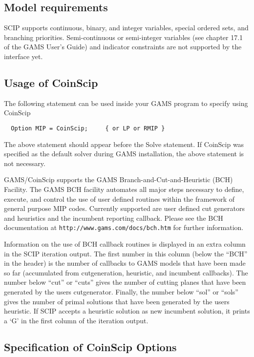\subsection{Model requirements}

SCIP supports continuous, binary, and integer variables, special ordered sets, and branching priorities.
Semi-continuous or semi-integer variables (see chapter 17.1 of the GAMS User's Guide) and indicator constraints are not supported by the interface yet.

\subsection{Usage of CoinScip}

The following statement can be used inside your GAMS program to specify using CoinScip
\begin{verbatim}
  Option MIP = CoinScip;     { or LP or RMIP }
\end{verbatim}

The above statement should appear before the Solve statement.
If CoinScip was specified as the default solver during GAMS installation, the above statement is not necessary.

GAMS/CoinScip supports the GAMS Branch-and-Cut-and-Heuristic (BCH) Facility.
The GAMS BCH facility automates all major steps necessary to define, execute, and control the use of user defined routines within the framework of general purpose MIP codes.
Currently supported are user defined cut generators and heuristics and the incumbent reporting callback.
Please see the BCH documentation at \texttt{http://www.gams.com/docs/bch.htm} for further information.

Information on the use of BCH callback routines is displayed in an extra column in the SCIP iteration output.
The first number in this column (below the ``BCH'' in the header) is the number of callbacks to GAMS models that have been made so far (accumulated from cutgeneration, heuristic, and incumbent callbacks).
The number below ``cut'' or ``cuts'' gives the number of cutting planes that have been generated by the users cutgenerator.
Finally, the number below ``sol'' or ``sols'' gives the number of primal solutions that have been generated by the users heuristic.
If SCIP accepts a heuristic solution as new incumbent solution, it prints a `G' in the first column of the iteration output.

\subsection{Specification of CoinScip Options}

